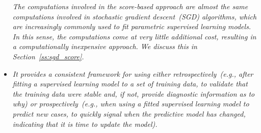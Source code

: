 \documentclass[twoside,11pt]{article}
\begin{document}
\begin{itemize}
\textit{The computations involved in the score-based approach are almost the same computations involved in stochastic gradient descent~(SGD) algorithms, which are increasingly commonly used to fit parametric supervised learning models. In this sense, the computations come at very little additional cost, resulting in a computationally inexpensive approach. We discuss this in Section~\ref{ss:sgd_score}.}
\item
\textit{It provides a consistent framework for using either retrospectively~(e.g., after fitting a supervised learning model to a set of training data, to validate that the training data were stable and, if not, provide diagnostic information as to why) or prospectively~(e.g., when using a fitted supervised learning model to predict new cases, to quickly signal when the predictive model has changed, indicating that it is time to update the model).}
\end{itemize}



\end{document}
